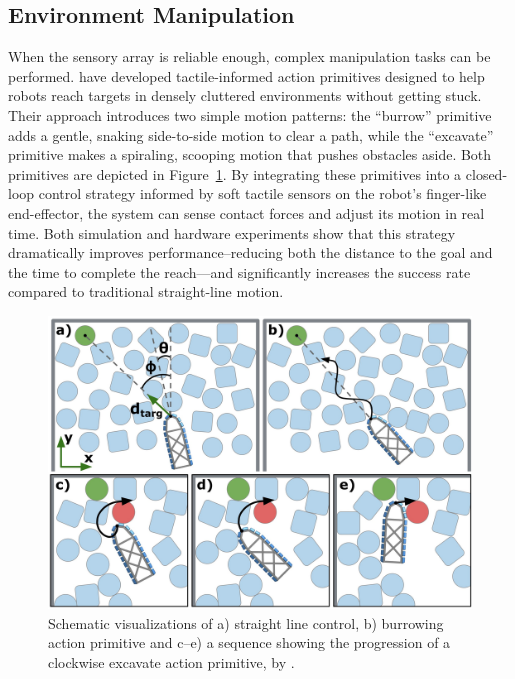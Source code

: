 \subsection{Environment Manipulation}
When the sensory array is reliable enough, complex manipulation tasks can be performed.
\textcite{Brouwer2024TactileInformedAP} have developed tactile-informed action primitives designed to help robots reach targets in densely cluttered environments without getting stuck.
Their approach introduces two simple motion patterns: the \enquote{burrow} primitive adds a gentle, snaking side-to-side motion to clear a path, while the \enquote{excavate} primitive makes a spiraling, scooping motion that pushes obstacles aside.
Both primitives are depicted in Figure~\ref{fig:environment-manipulation}.
By integrating these primitives into a closed-loop control strategy informed by soft tactile sensors on the robot’s finger-like end-effector, the system can sense contact forces and adjust its motion in real time.
Both simulation and hardware experiments show that this strategy dramatically improves performance--reducing both the distance to the goal and the time to complete the reach—and significantly increases the success rate compared to traditional straight-line motion.

\begin{figure}[htb]
    \centering
    \includegraphics[width=\textwidth]{figures/environment-manipulation}
    \caption{Schematic visualizations of a) straight line control, b) burrowing action primitive and c–e) a sequence showing the progression of a clockwise excavate action primitive, by \textcite{Brouwer2024TactileInformedAP}.}
    \label{fig:environment-manipulation}
\end{figure}